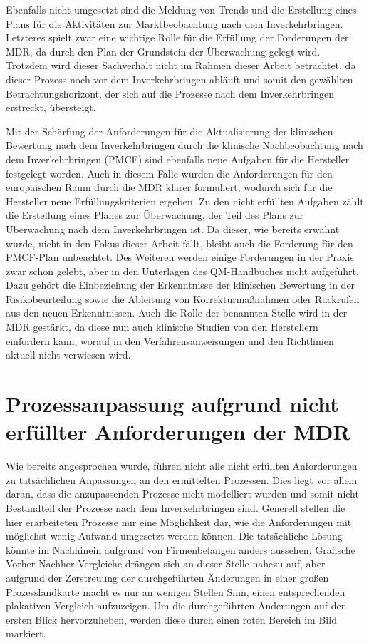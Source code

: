 \documentclass[a4paper,12pt]{report}
\begin{document}
Ebenfalls nicht umgesetzt sind die Meldung von Trends und die Erstellung eines Plans für die Aktivitäten zur Marktbeobachtung nach dem Inverkehrbringen. Letzteres spielt zwar eine wichtige Rolle für die Erfüllung der Forderungen der MDR, da durch den Plan der Grundstein der Überwachung gelegt wird. Trotzdem wird dieser Sachverhalt nicht im Rahmen dieser Arbeit betrachtet, da dieser Prozess noch vor dem Inverkehrbringen abläuft und somit den gewählten Betrachtungshorizont, der sich auf die Prozesse nach dem Inverkehrbringen erstreckt, übersteigt.

Mit der Schärfung der Anforderungen für die Aktualisierung der klinischen Bewertung nach dem Inverkehrbringen durch die klinische Nachbeobachtung nach dem Inverkehrbringen (PMCF) sind ebenfalls neue Aufgaben für die Hersteller festgelegt worden. Auch in diesem Falle wurden die Anforderungen für den europäischen Raum durch die MDR klarer formuliert, wodurch sich für die Hersteller neue Erfüllungskriterien ergeben. Zu den nicht erfüllten Aufgaben zählt die Erstellung eines Planes zur Überwachung, der Teil des Plans zur Überwachung nach dem Inverkehrbringen ist. Da dieser, wie bereits erwähnt wurde, nicht in den Fokus dieser Arbeit fällt, bleibt auch die Forderung für den PMCF-Plan unbeachtet. Des Weiteren werden einige Forderungen in der Praxis zwar schon gelebt, aber in den Unterlagen des QM-Handbuches nicht aufgeführt. Dazu gehört die Einbeziehung der Erkenntnisse der klinischen Bewertung in der Risikobeurteilung sowie die Ableitung von Korrekturmaßnahmen oder Rückrufen aus den neuen Erkenntnissen. Auch die Rolle der benannten Stelle wird in der MDR gestärkt, da diese nun auch klinische Studien von den Herstellern einfordern kann, worauf in den Verfahrensanweisungen und den Richtlinien aktuell nicht verwiesen wird.

\section{Prozessanpassung aufgrund nicht erfüllter Anforderungen der MDR}
Wie bereits angesprochen wurde, führen nicht alle nicht erfüllten Anforderungen zu tatsächlichen Anpassungen an den ermittelten Prozessen. Dies liegt vor allem daran, dass die anzupassenden Prozesse nicht modelliert wurden und somit nicht Bestandteil der Prozesse nach dem Inverkehrbringen sind. Generell stellen die hier erarbeiteten Prozesse nur eine Möglichkeit dar, wie die Anforderungen mit möglichst wenig Aufwand umgesetzt werden können. Die tatsächliche Lösung könnte im Nachhinein aufgrund von Firmenbelangen anders aussehen. Grafische Vorher-Nachher-Vergleiche drängen sich an dieser Stelle nahezu auf, aber aufgrund der Zerstreuung der durchgeführten Änderungen in einer großen Prozesslandkarte macht es nur an wenigen Stellen Sinn, einen entsprechenden plakativen Vergleich aufzuzeigen. Um die durchgeführten Änderungen auf den ersten Blick hervorzuheben, werden diese durch einen roten Bereich im Bild markiert. 
\end{document}
